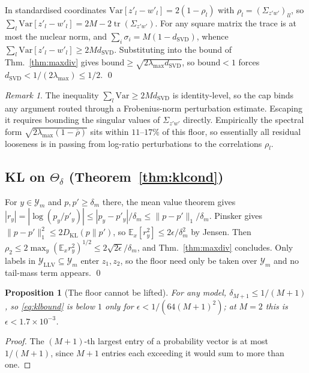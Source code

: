 \documentclass[10pt,letterpaper,twocolumn]{article}
\newcommand{\Y}{\mathcal{Y}}
\newcommand{\dSVD}{d_{\mathrm{SVD}}}
\newcommand{\Var}{\mathrm{Var}}
\newcommand{\Thetadelta}{\Theta_{\delta}}
\theoremstyle{plain}
\newtheorem{proposition}[theorem]{Proposition}
\theoremstyle{definition}
\theoremstyle{remark}
\newtheorem{remark}[theorem]{Remark}
\begin{document}
In standardised coordinates $\Var[z'_{l}-w'_{l}]=2(1-\rho_{l})$ with
$\rho_{l}=(\Sigma_{z'w'})_{ll}$, so
$\sum_{l}\Var[z'_{l}-w'_{l}]=2M-2\operatorname{tr}(\Sigma_{z'w'})$. For any
square matrix the trace is at most the nuclear norm, and
$\sum_{i}\sigma_{i}=M(1-\dSVD)$, whence
$\sum_{l}\Var[z'_{l}-w'_{l}]\ge2M\dSVD$. Substituting into the bound of
Thm.~\ref{thm:maxdiv} gives $\mathrm{bound}\ge\sqrt{2\lambda_{\max}\dSVD}$, so
$\mathrm{bound}<1$ forces $\dSVD<1/(2\lambda_{\max})\le1/2$. \qed

\begin{remark}
The inequality $\sum_{l}\Var\ge2M\dSVD$ is identity-level, so the cap binds any
argument routed through a Frobenius-norm perturbation estimate. Escaping it
requires bounding the singular values of $\Sigma_{z'w'}$ directly. Empirically
the spectral form $\sqrt{2\lambda_{\max}(1-\bar\rho)}$ sits within $11$--$17\%$
of this floor, so essentially all residual looseness is in passing from
log-ratio perturbations to the correlations $\rho_{l}$.
\end{remark}

\subsection{KL on $\Thetadelta$ (Theorem~\ref{thm:klcond})}

For $y\in\Y_{m}$ and $p,p'\ge\delta_{m}$ there, the mean value theorem gives
$|r_{y}|=|\log(p_{y}/p'_{y})|\le|p_{y}-p'_{y}|/\delta_{m}\le\|p-p'\|_{1}/\delta_{m}$.
Pinsker gives $\|p-p'\|_{1}^{2}\le2D_{\mathrm{KL}}(p\|p')$, so
$\mathbb{E}_{x}[r_{y}^{2}]\le2\epsilon/\delta_{m}^{2}$ by Jensen. Then
$\rho_{2}\le2\max_{y}(\mathbb{E}_{x}r_{y}^{2})^{1/2}\le2\sqrt{2\epsilon}/\delta_{m}$,
and Thm.~\ref{thm:maxdiv} concludes. Only labels in
$\mathcal{Y}_{\mathrm{LLV}}\subseteq\Y_{m}$ enter $z_{1},z_{2}$, so the floor
need only be taken over $\Y_{m}$ and no tail-mass term appears. \qed

\begin{proposition}[The floor cannot be lifted]
\label{prop:floorcap}
For any model, $\delta_{M+1}\le1/(M+1)$, so \eqref{eq:klbound} is below $1$ only
for $\epsilon<1/(64(M+1)^{2})$; at $M=2$ this is $\epsilon<1.7\times10^{-3}$.
\end{proposition}
\begin{proof}
The $(M{+}1)$-th largest entry of a probability vector is at most $1/(M+1)$,
since $M+1$ entries each exceeding it would sum to more than one.
\end{proof}
\end{document}
